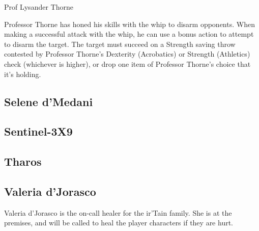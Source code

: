 \documentclass[twocolumn]{dndbook}
\begin{document}
\begin{DndMonster}[width=.5\textwidth]{Prof Lysander Thorne}

	\DndMonsterBasics[
	  armor-class = {12 (studded leather)},
	  hit-points  = {\DndDice{6d8 + 6}},
	  speed       = {30 ft.},
	]

	\DndMonsterAbilityScores[
	  str = 10,
	  dex = 14,
	  con = 12,
	  int = 16,
	  wis = 14,
	  cha = 12,
	]

	\DndMonsterDetails[
	  senses = {passive Perception 12},
	  languages = {Common, Elvish, Dwarvish},
	  challenge = 1/4,
	]

	Professor Thorne has honed his skills with the whip to disarm opponents. When making a successful attack with the whip, he can use a bonus action to attempt to disarm the target. The target must succeed on a Strength saving throw contested by Professor Thorne's Dexterity (Acrobatics) or Strength (Athletics) check (whichever is higher), or drop one item of Professor Thorne's choice that it's holding.

	\DndMonsterMelee[
	  name=Whip,
	  mod=+4,
	  dmg=\DndDice{1d4 + 2},
	  dmg-type=slashing,
	  extra={, and the target must make a DC 12 Strength saving throw or drop one item they are holding.},
	]

  \end{DndMonster}

\subsection{Selene d'Medani}
\label{subsec:selene_dmedani}

\subsection{Sentinel-3X9}
\label{subsec:sentinel_3x9}

\subsection{Tharos}
\label{subsec:tharos}

\subsection{Valeria d'Jorasco}
\label{subsec:valeria_djorasco}
Valeria d'Jorasco is the on-call healer for the ir'Tain family.
She is at the premises, and will be called to heal the player characters if they are hurt.
\end{document}
